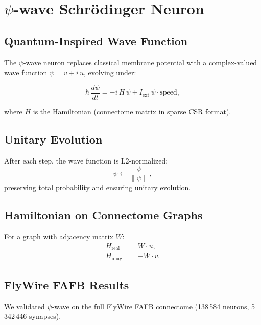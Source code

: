\documentclass[twocolumn,10pt]{article}
\newcommand{\psiwave}{$\psi$-wave}
\begin{document}
\section{\psiwave{} Schr\"odinger Neuron}

\subsection{Quantum-Inspired Wave Function}

The \psiwave{} neuron replaces classical membrane potential with a complex-valued wave function $\psi = v + i\,u$, evolving under:

\begin{equation}
\hbar\,\frac{d\psi}{dt} = -i\,H\,\psi + I_{\text{ext}}\,\psi\cdot\text{speed},
\end{equation}

where $H$ is the Hamiltonian (connectome matrix in sparse CSR format).

\subsection{Unitary Evolution}

After each step, the wave function is L2-normalized:
\begin{equation}
\psi \leftarrow \frac{\psi}{\|\psi\|},
\end{equation}
preserving total probability and ensuring unitary evolution.

\subsection{Hamiltonian on Connectome Graphs}

For a graph with adjacency matrix $W$:
\begin{align}
H_{\text{real}} &= W \cdot u, \\
H_{\text{imag}} &= -W \cdot v.
\end{align}

\subsection{FlyWire FAFB Results}

We validated \psiwave{} on the full FlyWire FAFB connectome (138\,584 neurons, 5\,342\,446 synapses).
\end{document}
